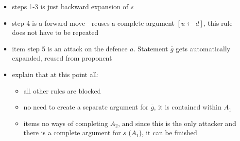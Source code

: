 \documentclass[conference]{IEEEtran}
\newcommand{\rulA}[2]{\ensuremath{#1 \leftarrow #2}\xspace}
\newcommand{\argu}[1]{\ensuremath{A_{#1}}}
\newcommand{\arguInline}[2]{\ensuremath{[\rulA{#1}{#2}]}}
\newcommand{\stmt}[1]{\ensuremath{#1}}
\begin{document}
\begin{itemize}
  \begin{itemize}
    \item steps 1-3 is just backward expansion of \stmt{s} 
    \item step 4 is a forward move - reuses a complete argument \arguInline{u}{d}, this rule does not have to be repeated
    \item item step 5 is an attack on the defence \stmt{a}. Statement \stmt{\bar{g}} gets automatically expanded, reused from proponent
    \item explain that at this point all:
    \begin{itemize}
      \item all other rules are blocked
      \item no need to create a separate argument for \stmt{\bar{g}}, it is contained within \argu{1}
      \item items no ways of completing \argu{2}, and since this is the only attacker and there is a complete argument for \stmt{s} (\argu{1}), it can be finished
    \end{itemize}
  \end{itemize}  
  
\end{itemize}
   
\end{document}

